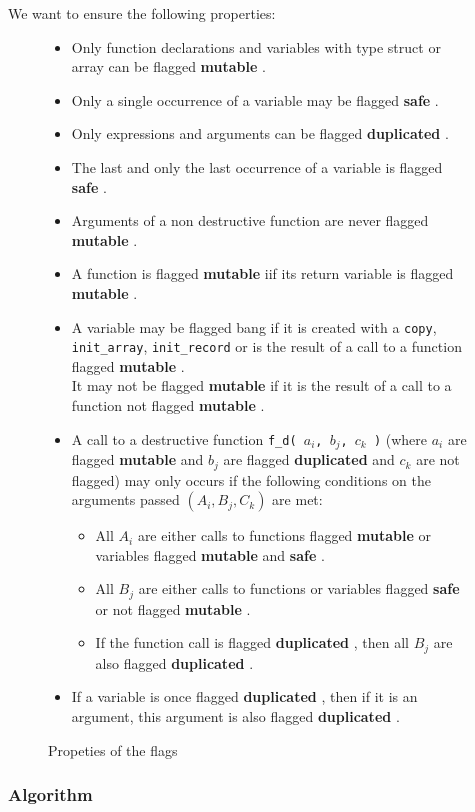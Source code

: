 \documentclass[12pt,a4paper]{article}
\newcommand{\cl}[1]{\texttt{#1}}
\newcommand{\bang}{ \textbf{ mutable } }
\newcommand{\safe}{ \textbf{ safe } }
\newcommand{\dupl}{ \textbf{ duplicated } }
\begin{document}
We want to ensure the following properties:

\begin{figure}
\begin{itemize}
\item Only function declarations and variables with type struct or array can be flagged \bang.
\item Only a single occurrence of a variable may be flagged \safe.
\item Only expressions and arguments can be flagged \dupl.
\item The last and only the last occurrence of a variable is flagged \safe.
\item Arguments of a non destructive function are never flagged \bang.
\item A function is flagged \bang iif its return variable is flagged \bang.
\item A variable may be flagged bang if it is created with a \cl{copy}, \cl{init\_array}, \cl{init\_record} or is the result of a call to a function flagged \bang.\\
It may not be flagged \bang if it is the result of a call to a function not flagged \bang.
\item A call to a destructive function \cl{f\_d( $a_i$, $b_j$, $c_k$ )} (where $a_i$ are flagged \bang and $b_j$ are flagged \dupl and $c_k$ are not flagged) may only occurs if the following conditions on the arguments passed $( A_i, B_j, C_k )$ are met:
\begin{itemize}
\item All $A_i$ are either calls to functions flagged \bang or variables flagged \bang and \safe.
\item All $B_j$ are either calls to functions or variables flagged \safe or not flagged \bang.
\item If the function call is flagged \dupl, then all $B_j$ are also flagged \dupl.
\end{itemize}
\item If a variable is once flagged \dupl, then if it is an argument, this argument is also flagged \dupl.
\end{itemize}
\caption{Propeties of the flags}
\label{fig:properties}
\end{figure}



\subsubsection{Algorithm}
\end{document}
